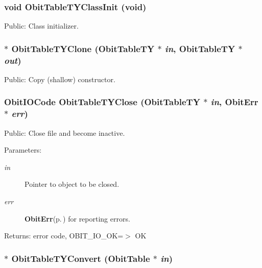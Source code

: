 \subsubsection{\setlength{\rightskip}{0pt plus 5cm}void Obit\-Table\-TYClass\-Init (void)}\label{ObitTableTY_8h_a10}


Public: Class initializer. 

\subsubsection{$\ast$ Obit\-Table\-TYClone ({\bf Obit\-Table\-TY} $\ast$ {\em in}, {\bf Obit\-Table\-TY} $\ast$ {\em out})}\label{ObitTableTY_8h_a15}


Public: Copy (shallow) constructor. 

\subsubsection{\setlength{\rightskip}{0pt plus 5cm}Obit\-IOCode Obit\-Table\-TYClose ({\bf Obit\-Table\-TY} $\ast$ {\em in}, {\bf Obit\-Err} $\ast$ {\em err})}\label{ObitTableTY_8h_a21}


Public: Close file and become inactive. 

\begin{Desc}
\item[Parameters:]
\begin{description}
\item[{\em in}]Pointer to object to be closed. \item[{\em err}]{\bf Obit\-Err}{\rm (p.\,\pageref{structObitErr})} for reporting errors. \end{description}
\end{Desc}
\begin{Desc}
\item[Returns:]error code, OBIT\_\-IO\_\-OK=$>$ OK \end{Desc}
\subsubsection{$\ast$ Obit\-Table\-TYConvert ({\bf Obit\-Table} $\ast$ {\em in})}\label{ObitTableTY_8h_a16}



